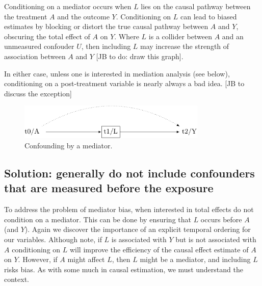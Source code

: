 \documentclass[
  singlecolumn]{report}
\begin{document}
Conditioning on a mediator occurs when \(L\) lies on the causal pathway
between the treatment \(A\) and the outcome \(Y\). Conditioning on \(L\)
can lead to biased estimates by blocking or distort the true causal
pathway between \(A\) and \(Y\), obscuring the total effect of \(A\) on
\(Y\). Where \(L\) is a collider between \(A\) and an unmeasured
confouder \(U\), then including \(L\) may increase the strength of
association between \(A\) and \(Y\) {[}JB to do: draw this graph{]}.

In either case, unless one is interested in mediation analysis (see
below), conditioning on a post-treatment variable is nearly always a bad
idea. {[}JB to discuss the exception{]}

\begin{figure}

{\centering \includegraphics[width=0.8\textwidth,height=\textheight]{causal-dags_files/figure-pdf/fig-dag-mediator-1.pdf}

}

\caption{\label{fig-dag-mediator}Confounding by a mediator.}

\end{figure}

\hypertarget{solution-generally-do-not-include-confounders-that-are-measured-before-the-exposure}{%
\subsection{Solution: generally do not include confounders that are
measured before the
exposure}\label{solution-generally-do-not-include-confounders-that-are-measured-before-the-exposure}}

To address the problem of mediator bias, when interested in total
effects do not condition on a mediator. This can be done by ensuring
that \(L\) occurs before \(A\) (and \(Y\)). Again we discover the
importance of an explicit temporal ordering for our variables. Although
note, if \(L\) is associated with \(Y\) but is not associated with \(A\)
conditioning on \(L\) will improve the efficiency of the causal effect
estimate of \(A\) on \(Y\). However, if \(A\) might affect \(L\), then
\(L\) might be a mediator, and including \(L\) risks bias. As with some
much in causal estimation, we must understand the context.
\end{document}
